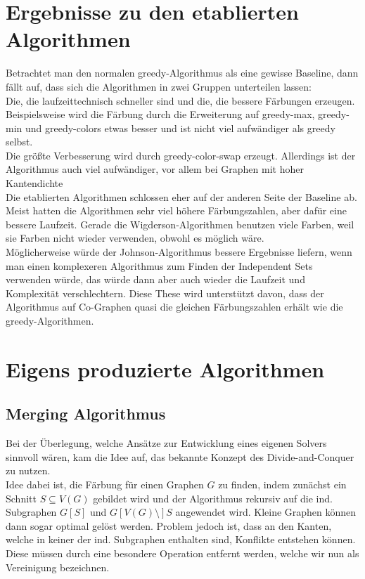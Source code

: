 \documentclass[11pt]{article}
\begin{document}
\section{Ergebnisse zu den etablierten Algorithmen} %

Betrachtet man den normalen greedy-Algorithmus als eine gewisse Baseline, dann fällt auf, dass sich die Algorithmen in zwei Gruppen unterteilen lassen: \\
Die, die laufzeittechnisch schneller sind und die, die bessere Färbungen erzeugen. Beispielsweise wird die Färbung durch die Erweiterung auf greedy-max, greedy-min und greedy-colors etwas besser und ist nicht viel aufwändiger als greedy selbst. \\
Die größte Verbesserung wird durch greedy-color-swap erzeugt. Allerdings ist der Algorithmus auch viel aufwändiger, vor allem bei Graphen mit hoher Kantendichte \\ %
Die etablierten Algorithmen schlossen eher auf der anderen Seite der Baseline ab. Meist hatten die Algorithmen sehr viel höhere Färbungszahlen, aber dafür eine bessere Laufzeit.
Gerade die Wigderson-Algorithmen benutzen viele Farben, weil sie Farben nicht wieder verwenden, obwohl es möglich wäre. \\
Möglicherweise würde der Johnson-Algorithmus bessere Ergebnisse liefern, wenn man einen komplexeren Algorithmus zum Finden der Independent Sets verwenden würde,
das würde dann aber auch wieder die Laufzeit und Komplexität verschlechtern. Diese These wird unterstützt davon, dass der Algorithmus auf Co-Graphen quasi die gleichen Färbungszahlen erhält wie die greedy-Algorithmen.

\section{Eigens produzierte Algorithmen} %
\subsection{Merging Algorithmus}
Bei der Überlegung, welche Ansätze zur Entwicklung eines eigenen Solvers sinnvoll wären,
kam die Idee auf, das bekannte Konzept des Divide-and-Conquer zu nutzen.\\
Idee dabei ist, die Färbung für einen Graphen $G$ zu finden, 
indem zunächst ein Schnitt $S\subseteq V(G)$ gebildet wird 
und der Algorithmus rekursiv auf die ind. Subgraphen 
$G[S]$ und $G[V(G)\setminus] S$ angewendet wird. 
Kleine Graphen können dann sogar optimal gelöst werden. 
Problem jedoch ist, dass an den Kanten, 
welche in keiner der ind. Subgraphen enthalten sind,
Konflikte entstehen können. Diese müssen durch eine besondere Operation entfernt werden, 
welche wir nun als Vereinigung bezeichnen.\par
\end{document}
